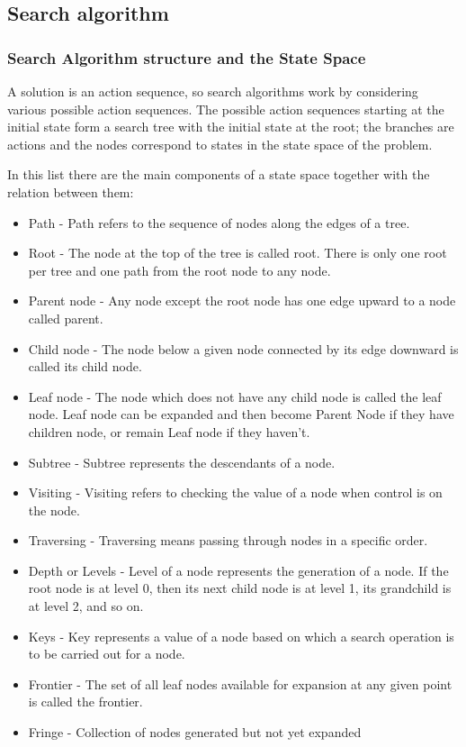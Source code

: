 \subsection{Search algorithm}

\subsubsection{Search Algorithm structure and the State Space}
A solution is an action sequence, so search algorithms work by considering various possible action sequences.
The possible action sequences starting at the initial state form a search tree with the initial state at the root; the branches are actions and the nodes correspond to states in the state space of the problem.

In this list there are the main components of a state space together with the relation between them:
\begin{itemize}
  \item Path - Path refers to the sequence of nodes along the edges of a tree.

  \item Root - The node at the top of the tree is called root. There is only one root per tree and one path from the root node to any node.

  \item Parent node - Any node except the root node has one edge upward to a node called parent.

  \item Child node - The node below a given node connected by its edge downward is called its child node.

  \item Leaf node - The node which does not have any child node is called the leaf node. Leaf node can be expanded and then become Parent Node if they have children node, or remain Leaf node if they haven't.

  \item Subtree - Subtree represents the descendants of a node.

  \item Visiting - Visiting refers to checking the value of a node when control is on the node.

  \item Traversing - Traversing means passing through nodes in a specific order.

  \item Depth or Levels - Level of a node represents the generation of a node. If the root node is at level 0, then its next child node is at level 1, its grandchild is at level 2, and so on.

  \item Keys - Key represents a value of a node based on which a search operation is to be carried out for a node.

  \item Frontier - The set of all leaf nodes available for expansion at any given point is called the frontier.

  \item Fringe - Collection of nodes generated but not yet expanded
\end{itemize}
